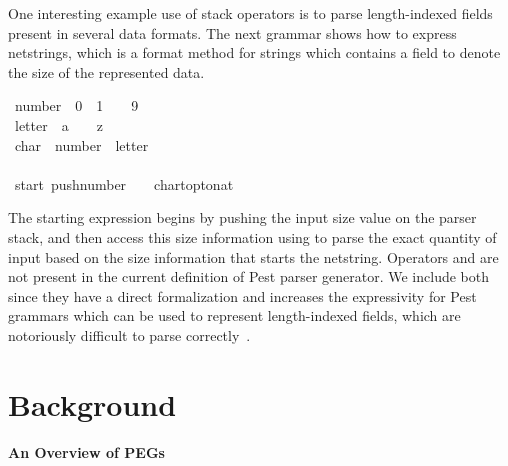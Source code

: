 \documentclass[sigplan,screen]{acmart}
\theoremstyle{definition}
\begin{document}
One interesting example use of stack operators is to parse
length-indexed fields present in several data formats.
The next grammar shows how to express netstrings, which is a format method
for strings which contains a field to denote the size of the represented data.
\begin{tabbing}\ttfamily
~number~~0~~1~~~~9\\
\ttfamily ~letter~~a~~~~z\\
\ttfamily ~char~~number~~letter\\
\ttfamily ~\\
\ttfamily ~start~pushnumber~~~~chartoptonat~~
\end{tabbing}
The starting expression begins by pushing the input size value on the parser stack,
and then access this size information using  to parse the exact
quantity of input based on the size information that starts the netstring.
Operators  and  are not present in the current
definition of Pest parser generator. We include both since they have a direct
formalization and increases the expressivity for Pest grammars which can be used
to represent length-indexed fields, which are notoriously difficult to parse
correctly~\cite{Zhang23, Lucks17}.


\section{Background}\label{sec:background}

\paragraph{An Overview of PEGs}
\end{document}
